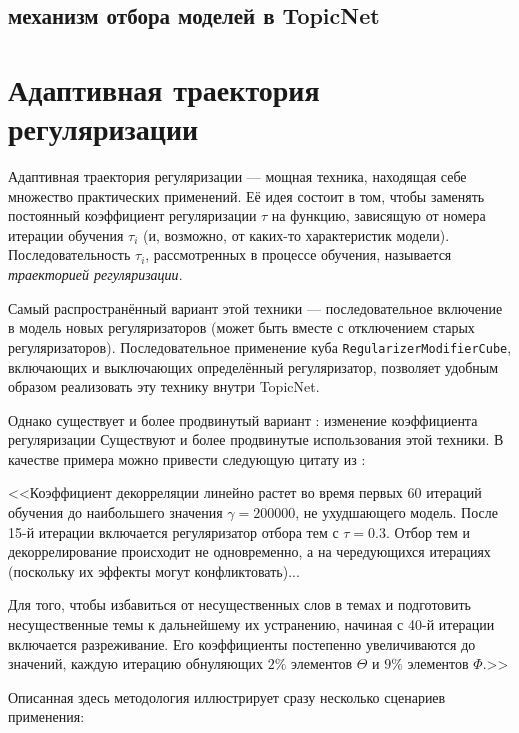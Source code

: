 \subsection{механизм отбора моделей в TopicNet}


\section{Адаптивная траектория регуляризации}

Адаптивная траектория регуляризации --- мощная техника, находящая себе множество практических применений. Её идея состоит в том, чтобы заменять постоянный коэффициент регуляризации $\tau$ на функцию, зависящую от номера итерации обучения $\tau_i$ (и, возможно, от каких-то характеристик модели). Последовательность $\tau_i$, рассмотренных в процессе обучения, называется \textit{траекторией регуляризации}.

Самый распространённый вариант этой техники --- последовательное включение в модель новых регуляризаторов (может быть вместе с отключением старых регуляризаторов). Последовательное применение куба \texttt{RegularizerModifierCube}, включающих и выключающих определённый регуляризатор, позволяет удобным образом реализовать эту технику внутри TopicNet.

Однако существует и более продвинутый вариант : изменение коэффициента регуляризации
Существуют и более продвинутые использования этой техники. В качестве примера можно привести следующую цитату из \cite{plavin}:

<<Коэффициент декорреляции линейно растет во время первых
60 итераций обучения до наибольшего значения $\gamma = 200000$, не ухудшающего модель. После 15-й итерации включается регуляризатор отбора тем с $\tau=0.3$. Отбор тем и декоррелирование происходит не одновременно, а на чередующихся итерациях (поскольку их эффекты могут конфликтовать)... 

Для того, чтобы избавиться от несущественных слов в темах и подготовить несущественные темы к дальнейшему их устранению, начиная с 40-й итерации включается разреживание. Его коэффициенты постепенно увеличиваются до значений, каждую итерацию обнуляющих $2\%$ элементов $\Theta$ и $9\%$ элементов $\Phi$.>>

Описанная здесь методология иллюстрирует сразу несколько сценариев применения:

